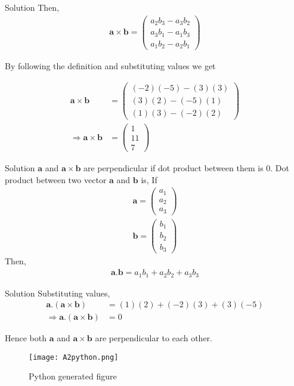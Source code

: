 \documentclass{beamer}
\let\vec\mathbf
\newcommand{\myvec}[1]{\ensuremath{\begin{pmatrix}#1\end{pmatrix}}}
\begin{document}
       \begin{frame}{Solution}
        Then,
    \begin{align}
            \vec{a}\times\vec{b}=\myvec{a_{2}b_{3}-a_{3}b_{2}\\a_{3}b_{1}-a_{1}b_{3}\\a_{1}b_{2}-a_{2}b_{1}}
    \end{align}
      
      By following the definition and substituting values we get
      
      \begin{align}
          \vec{a}\times\vec{b}&=\myvec{(-2)(-5)-(3)(3)\\(3)(2)-(-5)(1)\\(1)(3)-(-2)(2)}\\ 
         \Rightarrow  \vec{a}\times\vec{b}&=\myvec{1\\11\\7}
           \end{align}
           
       \end{frame}
       
       \begin{frame}{Solution}
       $\vec{a}$ and  $\vec{a}\times\vec{b}$ are perpendicular if dot product between them is $0$.  
    Dot product between two vector $\vec{a}$ and $\vec{b}$ is, If
    \begin{align}
        \vec{a}=\myvec{a_{1}\\a_{2}\\a_{3}}\\
        \vec{b}=\myvec{b_{1}\\b_{2}\\b_{3}}
    \end{align}
    Then,
    \begin{align}
      \vec{a}.\vec{b}=a_{1}b_{1}+a_{2}b_{2}+a_{3}b_{3}
    \end{align}
           
       \end{frame}
       
       \begin{frame}{Solution}
       Substituting values,
          \begin{align}
              \vec{a}. (\vec{a}\times\vec{b})&=(1)(2)+(-2)(3)+(3)(-5)\\
              \Rightarrow\vec{a}. (\vec{a}\times\vec{b})&=0
          \end{align}
          
          
          Hence both $\vec{a}$ and $\vec{a}\times\vec{b}$ are perpendicular to each other.
           
       \end{frame}
       
       \begin{frame}
       \begin{figure}[h]
              \centering
              \texttt{[image: A2python.png]}
              
              \caption{Python generated figure}
              \label{fig:my_label}
          \end{figure}
       
       \end{frame}
       
   
   
     
\end{document}
